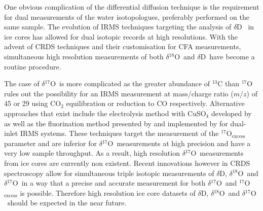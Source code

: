 \documentclass[11pt, draftcls, onecolumn]{IEEEtran} %
\numberwithin{equation}{section}
\numberwithin{table}{section}
\numberwithin{figure}{section}
\newcommand{\delOx}{$\delta{}^{18}\mathrm{O}$}
\newcommand{\delOxb}{$\delta{}^{17}\mathrm{O}$}
\newcommand{\delD}{$\delta\mathrm{D}$}
\begin{document}
One obvious complication of the differential diffusion technique is the requirement for dual measurements of the water 
isotopologues, preferably performed on the same sample.
The evolution of IRMS techniques targeting the analysis of \delD~\citep{BIGELEISEN1952, Vaughn1998, Gehre1996, Begley1997} in ice cores has allowed for dual isotopic records
at high resolutions. With the advent of CRDS techniques and their customisation for CFA measurements,
simultaneous high resolution measurements of both \delOx~and \delD~have become a routine procedure.

The case of \delOxb~is more complicated as the greater abundance of $^{13}$C than $^{17}$O rules out the
possibility for an IRMS measurement  at mass/charge ratio ($m/z$) of 45 or 29 using 
CO$_2$ equilibration or reduction to CO respectively. Alternative approaches that exist include the
electrolysis method with CuSO$_4$ developed by  \cite{Meijer1998} as well as the fluorination method
presented by \cite{Baker2002} and implemented by \cite{Barkan2005} for dual-inlet IRMS systems.
These techniques target the measurement of the $^{17}${O}$_{\mathrm{excess}}$ parameter and are inferior for
\delOxb~measurements at high precision and have a very low sample throughput.
As a result, high resolution \delOxb~measurements from ice cores are currently non existent. 
Recent innovations however in CRDS spectroscopy \citep{Steig2014} allow for simultaneous 
triple isotopic measurements of \delD, \delOx~and \delOxb~in a way that  a precise and accurate measurement 
for both \delOxb~and $^{17}${O}$_{\mathrm{excess}}$ is possible. Therefore high resolution ice core datasets of
\delD, \delOx~and \delOxb~should be expected in the near future. 
\end{document}
